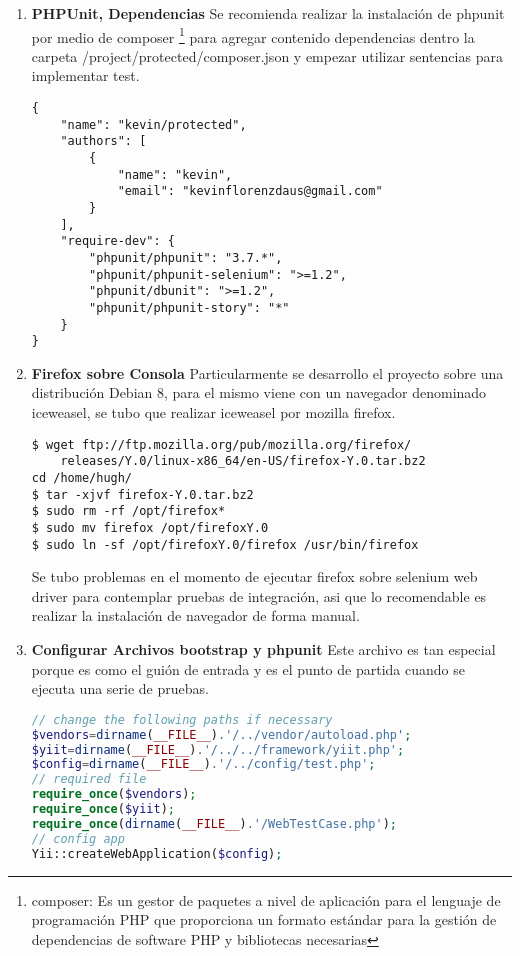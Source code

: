 \begin{enumerate}

\item \textbf{PHPUnit, Dependencias}
Se recomienda realizar la instalaci\'{o}n de phpunit por medio de composer 
\footnote{composer: Es un gestor de paquetes a nivel de aplicaci\'{o}n para el
lenguaje de programaci\'{o}n PHP que proporciona un formato est\'{a}ndar para
la gesti\'{o}n de dependencias de software PHP y bibliotecas necesarias} para
agregar contenido dependencias dentro la carpeta  /project/protected/composer.json
y empezar utilizar sentencias para implementar test.

\begin{lstlisting}[]
{
    "name": "kevin/protected",
    "authors": [
        {
            "name": "kevin",
            "email": "kevinflorenzdaus@gmail.com"
        }
    ],
    "require-dev": {
        "phpunit/phpunit": "3.7.*",
        "phpunit/phpunit-selenium": ">=1.2",
        "phpunit/dbunit": ">=1.2",
        "phpunit/phpunit-story": "*"
    }
}
\end{lstlisting}

\item \textbf{Firefox sobre Consola}
Particularmente se desarrollo el proyecto sobre una distribuci\'{o}n Debian 8,
para el mismo viene con un navegador denominado iceweasel, se tubo que realizar
iceweasel por mozilla firefox.

\begin{lstlisting}[]
$ wget ftp://ftp.mozilla.org/pub/mozilla.org/firefox/
	releases/Y.0/linux-x86_64/en-US/firefox-Y.0.tar.bz2
cd /home/hugh/
$ tar -xjvf firefox-Y.0.tar.bz2
$ sudo rm -rf /opt/firefox*
$ sudo mv firefox /opt/firefoxY.0
$ sudo ln -sf /opt/firefoxY.0/firefox /usr/bin/firefox
\end{lstlisting}

Se tubo problemas en el momento de ejecutar firefox sobre selenium web driver
para contemplar pruebas de integraci\'{o}n, asi que lo recomendable es realizar
la instalaci\'{o}n de navegador de forma manual.

\item \textbf{Configurar Archivos bootstrap y phpunit}
Este archivo es tan especial porque es como el gui\'{o}n de entrada y es el punto
de partida cuando se ejecuta una serie de pruebas. \cite{testing}

\begin{lstlisting}[language=PHP]
// change the following paths if necessary
$vendors=dirname(__FILE__).'/../vendor/autoload.php';
$yiit=dirname(__FILE__).'/../../framework/yiit.php';
$config=dirname(__FILE__).'/../config/test.php';
// required file
require_once($vendors);
require_once($yiit);
require_once(dirname(__FILE__).'/WebTestCase.php');
// config app
Yii::createWebApplication($config);
\end{lstlisting}


\end{enumerate}
